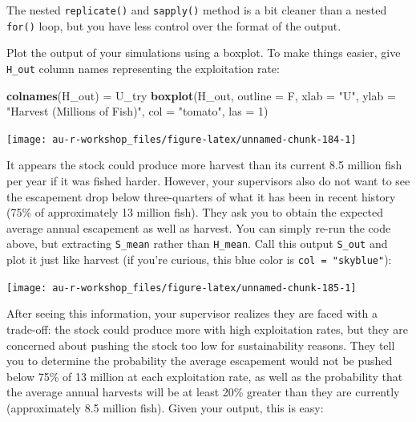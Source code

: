 \documentclass[]{book}
\newenvironment{Shaded}{\begin{snugshade}}{\end{snugshade}}
\newcommand{\KeywordTok}[1]{\textcolor[rgb]{0.13,0.29,0.53}{\textbf{#1}}}
\newcommand{\DataTypeTok}[1]{\textcolor[rgb]{0.13,0.29,0.53}{#1}}
\newcommand{\DecValTok}[1]{\textcolor[rgb]{0.00,0.00,0.81}{#1}}
\newcommand{\StringTok}[1]{\textcolor[rgb]{0.31,0.60,0.02}{#1}}
\newcommand{\NormalTok}[1]{#1}
\theoremstyle{definition}
\theoremstyle{definition}
\theoremstyle{definition}
\theoremstyle{remark}
\begin{document}
The nested \texttt{replicate()} and \texttt{sapply()} method is a bit
cleaner than a nested \texttt{for()} loop, but you have less control
over the format of the output.

Plot the output of your simulations using a boxplot. To make things
easier, give \texttt{H\_out} column names representing the exploitation
rate:

\begin{Shaded}
\begin{Highlighting}[]
\KeywordTok{colnames}\NormalTok{(H_out) =}\StringTok{ }\NormalTok{U_try}
\KeywordTok{boxplot}\NormalTok{(H_out, }\DataTypeTok{outline =}\NormalTok{ F,}
        \DataTypeTok{xlab =} \StringTok{"U"}\NormalTok{, }\DataTypeTok{ylab =} \StringTok{"Harvest (Millions of Fish)"}\NormalTok{,}
        \DataTypeTok{col =} \StringTok{"tomato"}\NormalTok{, }\DataTypeTok{las =} \DecValTok{1}\NormalTok{)}
\end{Highlighting}
\end{Shaded}

\begin{center}\texttt{[image: au-r-workshop\_files/figure-latex/unnamed-chunk-184-1]} \end{center}

It appears the stock could produce more harvest than its current 8.5
million fish per year if it was fished harder. However, your supervisors
also do not want to see the escapement drop below three-quarters of what
it has been in recent history (75\% of approximately 13 million fish).
They ask you to obtain the expected average annual escapement as well as
harvest. You can simply re-run the code above, but extracting
\texttt{S\_mean} rather than \texttt{H\_mean}. Call this output
\texttt{S\_out} and plot it just like harvest (if you're curious, this
blue color is \texttt{col\ =\ "skyblue"}):

\begin{center}\texttt{[image: au-r-workshop\_files/figure-latex/unnamed-chunk-185-1]} \end{center}

After seeing this information, your supervisor realizes they are faced
with a trade-off: the stock could produce more with high exploitation
rates, but they are concerned about pushing the stock too low for
sustainability reasons. They tell you to determine the probability the
average escapement would not be pushed below 75\% of 13 million at each
exploitation rate, as well as the probability that the average annual
harvests will be at least 20\% greater than they are currently
(approximately 8.5 million fish). Given your output, this is easy:
\end{document}
